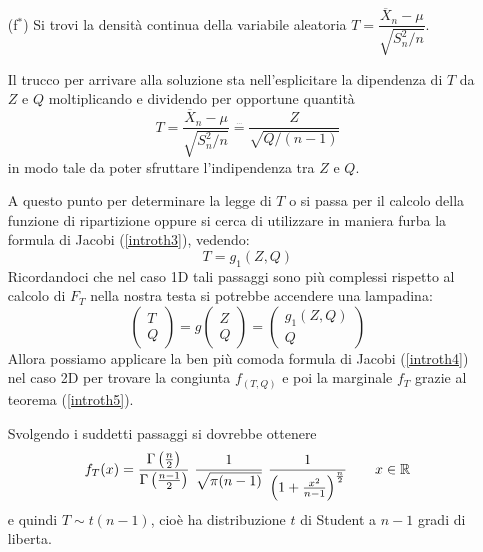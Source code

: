 \begin{enumerate}
\item [(f$^*$)] Si trovi la densità continua della variabile aleatoria $T=\dfrac{\overline{X}_n-\mu}{\sqrt{S_n^2/n}}$.

Il trucco per arrivare alla soluzione sta nell'esplicitare la dipendenza di $T$ da $Z$ e $Q$ moltiplicando e dividendo per opportune quantità
$$
T=\frac{\overline{X}_n-\mu}{\sqrt{S_n^2/n}}\overset{\underset{\dots}{}}{=}\frac{Z}{\sqrt{Q/(n-1)}}
$$
in modo tale da poter sfruttare l'indipendenza tra $Z$ e $Q$.

A questo punto per determinare la legge di $T$ o si passa per il calcolo della funzione di ripartizione oppure si cerca di utilizzare in maniera furba la formula di Jacobi (\ref{introth3}), vedendo:
$$ T = g_1(Z,Q) $$
Ricordandoci che nel caso 1D tali passaggi sono più complessi rispetto al calcolo di $F_T$ nella nostra testa si potrebbe accendere una lampadina:
$$
\begin{pmatrix}
T \\ Q
\end{pmatrix}
=
g \begin{pmatrix}
Z \\ Q
\end{pmatrix}
=
\begin{pmatrix}
g_1(Z,Q) \\ Q
\end{pmatrix}  
$$
Allora possiamo applicare la ben più comoda formula di Jacobi (\ref{introth4}) nel caso 2D per trovare la congiunta $f_{(T,Q)}$ e poi la marginale $f_T$ grazie al teorema (\ref{introth5}). 

Svolgendo i suddetti passaggi si dovrebbe ottenere
$$
f_T(x)=\frac{\Gamma\left(\frac{n}{2}\right)}{\Gamma\left(\frac{n-1}{2}\right)}\ \frac{1}{\sqrt{\pi(n-1)}}\ \frac{1}{\left(1+\frac{x^2}{n-1}\right)^{\frac{n}{2}}} \qquad x\in\RR
$$
e quindi $T\sim t(n-1)$, cioè ha distribuzione $t$ di Student a $n-1$ gradi di liberta.


\end{enumerate}